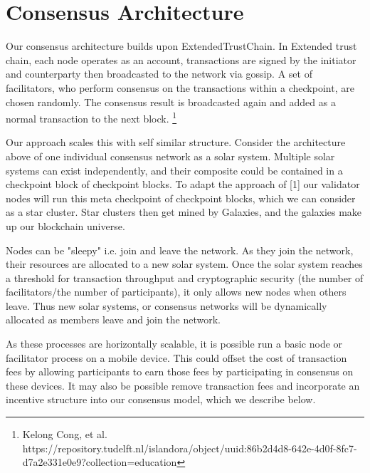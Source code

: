 \documentclass{article}
\begin{document}
\section{Consensus Architecture}
Our consensus architecture builds upon ExtendedTrustChain. In Extended trust chain, each node operates as an account, transactions are signed by the initiator and counterparty then broadcasted to the network via gossip. A set of facilitators, who perform consensus on the transactions within a checkpoint, are chosen randomly. The consensus result is broadcasted again and added as a normal transaction to the next block. \footnote{Kelong Cong, et al. https://repository.tudelft.nl/islandora/object/uuid:86b2d4d8-642e-4d0f-8fc7-d7a2e331e0e9?collection=education} 

Our approach scales this with self similar structure. Consider the architecture above of one individual consensus network as a solar system. Multiple solar systems can exist independently, and their composite could be contained in a checkpoint block of checkpoint blocks. To adapt the approach of [1] our validator nodes will run this meta checkpoint of checkpoint blocks, which we can consider as a star cluster. Star clusters then get mined by Galaxies, and the galaxies make up our blockchain universe.

Nodes can be "sleepy" i.e. join and leave the network. As they join the network, their resources are allocated to a new solar system. Once the solar system reaches a threshold for transaction throughput and cryptographic security (the number of facilitators/the number of participants), it only allows new nodes when others leave. Thus new solar systems, or consensus networks will be dynamically allocated as members leave and join the network.

As these processes are horizontally scalable, it is possible run a basic node or facilitator process on a mobile device. This could offset the cost of transaction fees by allowing participants to earn those fees by participating in consensus on these devices. It may also be possible remove transaction fees and incorporate an incentive structure into our consensus model, which we describe below.
\end{document}
